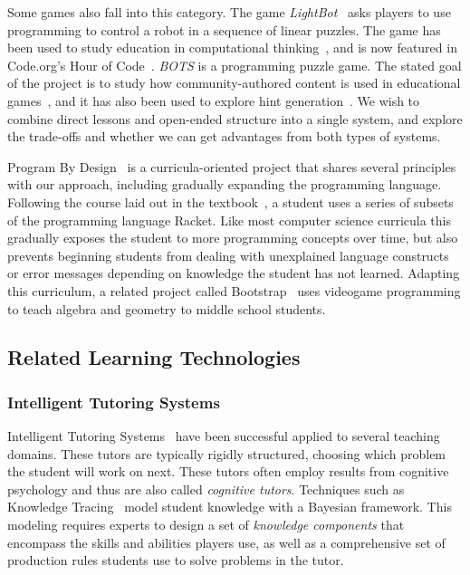 \documentclass{sig-alternate}
\begin{document}
Some games also fall into this category.
The game \emph{LightBot}~\cite{lightbot} asks players to use programming to control a robot in a sequence of linear puzzles.
The game has been used to study education in computational thinking~\cite{Gouws13Lightbot}, and is now featured in Code.org's Hour of Code~\cite{lightbothoc}.
\emph{BOTS} is a programming puzzle game. The stated goal of the project is to study how community-authored content is used in educational games~\cite{hickspart14}, and it has also been used to explore hint generation~\cite{peddycord14generating}.
We wish to combine direct lessons and open-ended structure into a single system, and explore the trade-offs and whether we can get advantages from both types of systems.

Program By Design~\cite{programbydesign} is a curricula-oriented project that shares several principles with our approach, including gradually expanding the programming language. 
Following the course laid out in the textbook~\cite{felleisen2001design}, a student uses a series of subsets of the programming language Racket.
Like most computer science curricula this gradually exposes the student to more programming concepts over time, but also prevents beginning students from dealing with unexplained language constructs or error messages depending on knowledge the student has not learned.
Adapting this curriculum, a related project called Bootstrap~\cite{bootstrap} uses videogame programming to teach algebra and geometry to middle school students.

\subsection{Related Learning Technologies}

\subsubsection{Intelligent Tutoring Systems}
Intelligent Tutoring Systems~\cite{koedinger06cognitive} have been successful applied to several teaching domains.
These tutors are typically rigidly structured, choosing which problem the student will work on next.
These tutors often employ results from cognitive psychology and thus are also called \emph{cognitive tutors}.
Techniques such as Knowledge Tracing~\cite{corbett1994knowledge} model student knowledge with a Bayesian framework.
This modeling requires experts to design a set of \emph{knowledge components} that encompass the skills and abilities players use, as well as a comprehensive set of production rules students use to solve problems in the tutor.
\end{document}
